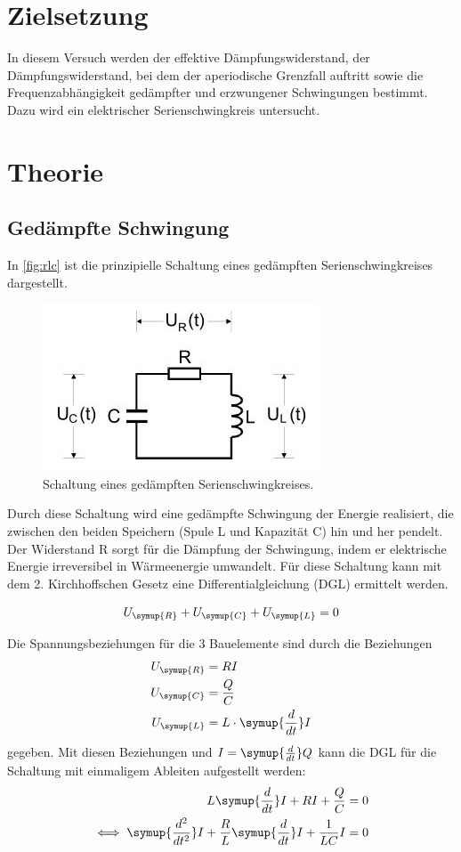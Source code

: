 \section*{Zielsetzung}
In diesem Versuch werden der effektive Dämpfungswiderstand, der Dämpfungswiderstand, bei dem der aperiodische Grenzfall auftritt sowie die Frequenzabhängigkeit gedämpfter und erzwungener Schwingungen bestimmt. Dazu wird ein elektrischer Serienschwingkreis untersucht. 

\section{Theorie}
\label{sec:Theorie}
\subsection{Gedämpfte Schwingung}
In \autoref{fig:rlc} ist die prinzipielle Schaltung eines gedämpften Serienschwingkreises dargestellt. 
\begin{figure}[H]
    \centering
    \includegraphics{bilder/rlc.JPG}
    \caption{Schaltung eines gedämpften Serienschwingkreises. \cite{sample}}
    \label{fig:rlc}
  \end{figure}
\noindent 
Durch diese Schaltung wird eine gedämpfte Schwingung der Energie realisiert, die
zwischen den beiden Speichern (Spule L und Kapazität C) hin und her pendelt. Der
Widerstand R sorgt für die Dämpfung der Schwingung, indem er elektrische Energie
irreversibel in Wärmeenergie umwandelt. Für diese Schaltung kann mit dem 2. Kirchhoffschen
Gesetz eine Differentialgleichung (DGL) ermittelt werden.

\begin{equation}
    U_{\symup{R}} + U_{\symup{C}} + U_{\symup{L}}   = 0     
    \label{eqn:masche}
\end{equation}

\noindent Die Spannungsbeziehungen für die 3 Bauelemente sind durch die Beziehungen
    \begin{align}
        U_{\symup{R}} & = RI \\
        U_{\symup{C}} & = \frac{Q}{C}\\
        U_{\symup{L}} & = L \cdot \symup{\frac{d}{dt}}I 
    \end{align}
\noindent gegeben. 
Mit diesen Beziehungen und $I=\symup{\frac{d}{dt}}Q$ kann die DGL für die Schaltung mit einmaligem Ableiten aufgestellt werden:
\begin{align}
        L  \symup{\frac{d}{dt}}I + RI + \frac{Q}{C} & = 0 \\
       \iff \symup{\frac{d^2}{dt^2}}I + \frac{R}{L} \symup{\frac{d}{dt}}I + \frac{1}{LC}I & = 0 
        \label{eqn:dgl}
\end{align}
    
